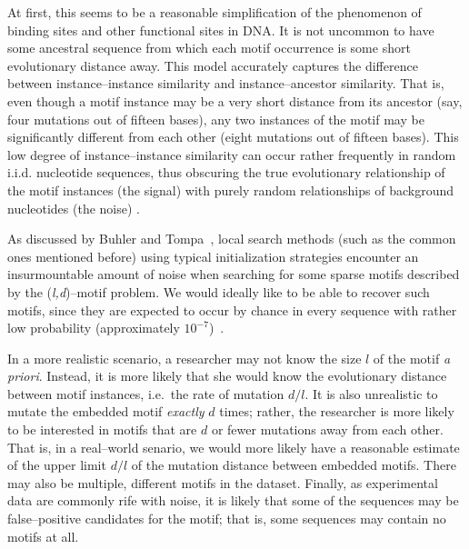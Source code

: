     At first, this seems to be a reasonable simplification of the phenomenon of
    binding sites and other functional sites in DNA.  It is not uncommon to have
    some ancestral sequence from which each motif occurrence is some short
    evolutionary distance away.  This model accurately captures the
    difference between instance--instance similarity and instance--ancestor
    similarity.  That is, even though a motif instance may be a very short
    distance from its ancestor (say, four mutations out of fifteen bases), any
    two instances of the motif may be significantly different from each other
    (eight mutations out of fifteen bases).  This low degree of instance--instance
    similarity can occur rather frequently in random i.i.d. nucleotide
    sequences, thus obscuring the true evolutionary relationship of the
    motif instances (the signal) with purely random relationships of background
    nucleotides (the noise) \cite{buhler2001finding,buhler2002finding}.

    As discussed by Buhler and Tompa~\cite{buhler2001finding}, local search methods (such as the
    common ones mentioned before) using typical initialization strategies
    encounter an insurmountable amount of noise when searching for some sparse motifs
    described by the (\textit{l,d})--motif problem.  We would ideally like
    to be able to recover such motifs, since they are expected to occur by chance
    in every sequence with rather low probability (approximately
    $10^{-7}$)~\cite{buhler2001finding,buhler2002finding}.

    In a more realistic scenario, a researcher may not know the size $l$
    of the motif \textit{a priori}.  Instead, it is more likely that she
    would know the evolutionary distance between motif instances, i.e.\
    the rate of mutation $d/l$.  It is also unrealistic to mutate
    the embedded motif \textit{exactly} $d$ times; rather, the researcher
    is more likely to be interested in motifs that are $d$ or fewer mutations
    away from each other.  That is, in a real--world senario, we would
    more likely have a reasonable estimate of the upper limit $d/l$ of the mutation distance
     between embedded motifs.
    There may also be multiple, different motifs in the dataset.  Finally,
    as experimental data are
    commonly rife with noise, it is likely that some of the sequences
    may be false--positive candidates for the motif; that is, some sequences may
    contain no motifs at all.


